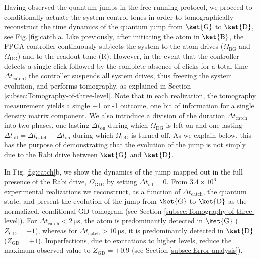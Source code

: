 Having observed the quantum jumps in the free-running protocol, we
proceed to conditionally actuate the system control tones in order
to tomographically reconstruct the time dynamics of the quantum jump
from $\ket{\mathrm{G}}$ to $\ket{\mathrm{D}}$, see Fig.\,\ref{fig:catch}a.
Like previously, after initiating the atom in $\ket{\mathrm{B}}$,
the FPGA controller continuously subjects the system to the atom drives
($\Omega_{\mathrm{BG}}$ and $\Omega_{\mathrm{DG}}$) and to the readout
tone ($\mathrm{R}$). However, in the event that the controller detects
a single click followed by the complete absence of clicks for a total
time $\Delta t_{\operatorname{catch}}$, the controller suspends all
system drives, thus freezing the system evolution, and performs tomography,
as explained in Section \ref{subsec:Tomography-of-three-level}. Note
that in each realization, the tomography measurement yields a single
+1 or -1 outcome, one bit of information for a single density matrix
component. We also introduce a division of the duration $\Delta t_{\operatorname{catch}}$
into two phases, one lasting $\Delta t_{\mathrm{on}}$ during which
$\Omega_{\mathrm{DG}}$ is left on and one lasting $\Delta t_{\mathrm{off}}=\Delta t_{\operatorname{catch}}-\Delta t_{\mathrm{on}}$
during which $\Omega_{\mathrm{DG}}$ is turned off. As we explain
below, this has the purpose of demonstrating that the evolution of
the jump is not simply due to the Rabi drive between $\ket{\mathrm{G}}$
and $\ket{\mathrm{D}}$.

In Fig.\,\ref{fig:catch}b, we show the dynamics of the jump mapped
out in the full presence of the Rabi drive, $\Omega_{\mathrm{GD}}$,
by setting $\Delta t_{\mathrm{off}}=0$. From $3.4\times10^{6}$ experimental
realizations we reconstruct, as a function of $\Delta t_{\operatorname{catch}}$,
the quantum state, and present the evolution of the jump from $\ket{\mathrm{G}}$
to $\ket{\mathrm{D}}$ as the normalized, conditional GD tomogram
(see Section \ref{subsec:Tomography-of-three-level}). For $\Delta t_{\operatorname{catch}}<2\,\mathrm{\mu s}$,
the atom is predominantly detected in $\ket{\mathrm{G}}$ ($Z_{\mathrm{GD}}=-1$),
whereas for $\Delta t_{\operatorname{catch}}>10\,\mathrm{\mu s}$,
it is predominantly detected in $\ket{\mathrm{D}}$ ($Z_{\mathrm{GD}}=+1$).
Imperfections, due to excitations to higher levels, reduce the maximum
observed value to $Z_{\mathrm{GD}}=+0.9$ (see Section\,\ref{subsec:Error-analysis}). 

